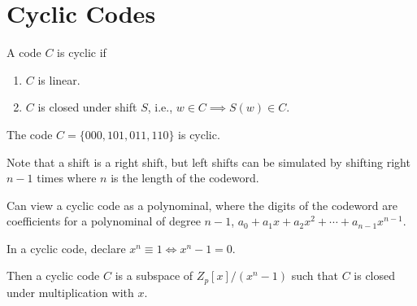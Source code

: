 \documentclass{article}
\begin{document}
\section{Cyclic Codes}
\begin{definition}
  A code \( C \) is cyclic if
  \begin{enumerate}
    \item \( C \) is linear.
    \item \( C \) is closed under shift \( S \), i.e., \( w \in C
          \implies S(w) \in C \).
  \end{enumerate}
\end{definition}
\begin{example}
  The code \( C = \{000, 101, 011, 110\} \) is cyclic.
\end{example}
\begin{remark}
  Note that a shift is a right shift, but left shifts can be
  simulated by shifting right \( n-1 \) times where \( n \) is the
  length of the codeword.
\end{remark}
\begin{remark}
  Can view a cyclic code as a polynominal, where the digits of the
  codeword are coefficients for a polynominal of degree \( n-1 \), \(
  a_0 + a_1x + a_2x^2 + \cdots + a_{n-1} x^{n-1}  \).
\end{remark}
\begin{definition}
  In a cyclic code, declare \( x^n \equiv 1 \iff x^n-1 = 0 \).

  Then a cyclic code \( C \) is a subspace of  \( Z_p[x]/(x^n-1) \)
  such that \( C \) is closed under multiplication with \( x \).

\end{definition}
\end{document}
